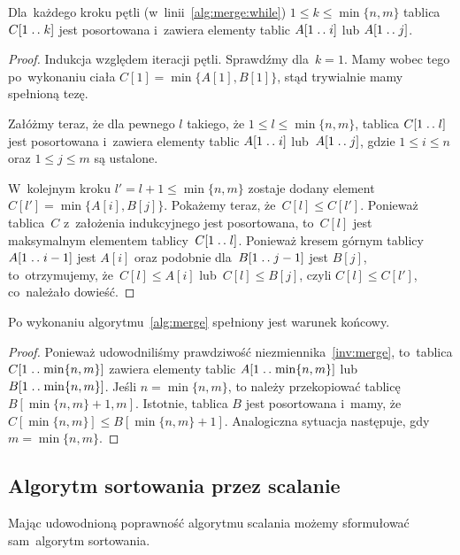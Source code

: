 \begin{invariant}
    \label{inv:merge}
    Dla~każdego kroku pętli (w~linii~\ref{alg:merge:while})
    \( 1 \le k \le \min \{n, m\} \)
    tablica \( C[1 \mathrel{{.}\,{.}}\nobreak k] \) jest posortowana i~zawiera elementy
    tablic \( A[1 \mathrel{{.}\,{.}}\nobreak i] \) lub \( A[1 \mathrel{{.}\,{.}}\nobreak j] \).
\end{invariant}
\begin{proof}
    Indukcja względem iteracji pętli. Sprawdźmy 
    dla~\( k = 1 \). Mamy wobec tego
    po~wykonaniu ciała \( C[1] = \min \{ A[1], B[1] \} \),
    stąd trywialnie mamy spełnioną tezę.

    Załóżmy teraz, że dla pewnego \( l \) takiego,
    że \( 1 \le l \le \min \{n, m\} \), tablica \( C[1 \mathrel{{.}\,{.}}\nobreak l] \) jest posortowana 
    i~zawiera elementy
    tablic \( A[1 \mathrel{{.}\,{.}}\nobreak i] \) lub~\( A[1 \mathrel{{.}\,{.}}\nobreak j] \), gdzie \( 1 \le i \le n \)
    oraz \( 1 \le j \le m \) są ustalone.
    
    W~kolejnym kroku \( l' = l + 1 \le \min \{ n, m \} \) zostaje dodany element
    \( C[l'] = \min \{ A[i], B[j] \} \). 
    Pokażemy teraz, że~\( C[l] \le C[l'] \).
    Ponieważ tablica~\( C \) z~założenia indukcyjnego jest posortowana,
    to~\( C[l] \) jest maksymalnym 
    elementem tablicy~\( C[1 \mathrel{{.}\,{.}}\nobreak l] \).
    Ponieważ kresem górnym tablicy~\( A[1 \mathrel{{.}\,{.}}\nobreak i - 1] \) jest \( A[i] \)
    oraz podobnie dla~\( B[1 \mathrel{{.}\,{.}}\nobreak j - 1] \) jest \( B[j] \),
    to~otrzymujemy, że~\( C[l] \le A[i] \) lub~\( C[l] \le B[j] \),
    czyli \( C[l] \le C[l'] \), co~należało dowieść.
\end{proof}

\begin{fact}
    Po wykonaniu algorytmu~\ref{alg:merge}
    spełniony jest warunek końcowy.
\end{fact}
\begin{proof}
    Ponieważ udowodniliśmy prawdziwość 
    niezmiennika~\ref{inv:merge}, 
    to~tablica \( C[1 \mathrel{{.}\,{.}}\nobreak \min \{ n, m \}] \)
    zawiera elementy tablic
    \( A[1 \mathrel{{.}\,{.}}\nobreak \min \{ n, m \}] \)
    lub~\( B[1 \mathrel{{.}\,{.}}\nobreak \min \{ n, m \}] \).
    Jeśli \( n = \min \{ n, m \} \),
    to należy przekopiować tablicę
    \( B[\min \{ n, m \} + 1, m] \).
    Istotnie, tablica \( B \) jest posortowana
    i~mamy, że~\( C[\min \{ n, m \}] 
    \le B[\min \{ n, m \} + 1] \).
    Analogiczna sytuacja następuje, 
    gdy~\( m = \min \{ n, m\} \).
\end{proof}

\subsection{Algorytm sortowania przez scalanie}
Mając udowodnioną poprawność algorytmu scalania
możemy sformułować sam~algorytm sortowania.

